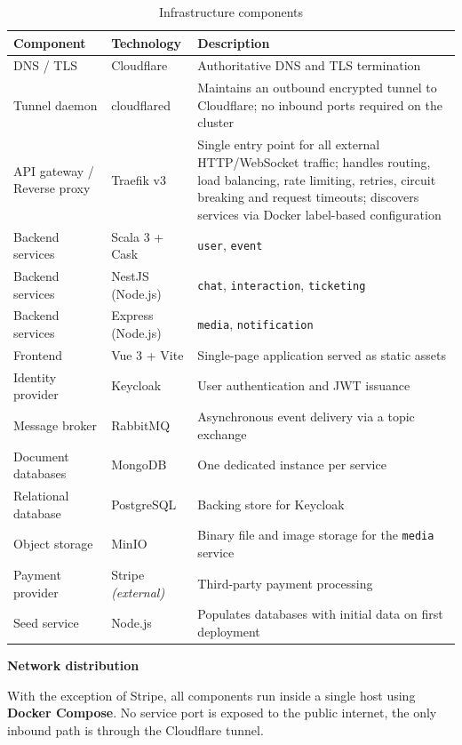 \begin{table}[H]
  \centering
  \begin{tabular}{p{3.2cm}p{3.2cm}p{7cm}}
    \toprule
    \textbf{Component} & \textbf{Technology} & \textbf{Description} \\
    \midrule
    DNS / TLS & Cloudflare & Authoritative DNS and TLS termination \\
    Tunnel daemon & cloudflared & Maintains an outbound encrypted tunnel to Cloudflare; no inbound ports required on the cluster \\
    API gateway / Reverse proxy & Traefik v3 & Single entry point for all external HTTP/WebSocket traffic; handles routing, load balancing, rate limiting, retries, circuit breaking and request timeouts; discovers services via Docker label-based configuration \\
    Backend services & Scala 3 + Cask & \texttt{user}, \texttt{event} \\
    Backend services & NestJS (Node.js) & \texttt{chat}, \texttt{interaction}, \texttt{ticketing} \\
    Backend services & Express (Node.js) & \texttt{media}, \texttt{notification} \\
    Frontend & Vue 3 + Vite & Single-page application served as static assets \\
    Identity provider & Keycloak & User authentication and JWT issuance \\
    Message broker & RabbitMQ & Asynchronous event delivery via a topic exchange \\
    Document databases & MongoDB & One dedicated instance per service \\
    Relational database & PostgreSQL & Backing store for Keycloak \\
    Object storage & MinIO & Binary file and image storage for the \texttt{media} service \\
    Payment provider & Stripe \textit{(external)} & Third-party payment processing \\
    Seed service & Node.js & Populates databases with initial data on first deployment \\
    \bottomrule
  \end{tabular}
  \caption{Infrastructure components}
  \label{tab:infrastructure}
\end{table}

\noindent\textbf{Network distribution}

With the exception of Stripe, all components run inside a single host using \textbf{Docker Compose}. No service port is exposed to the public internet, the only inbound path is through the Cloudflare tunnel.

